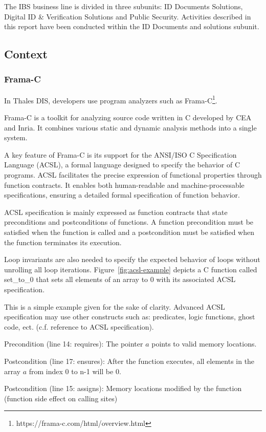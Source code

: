 \documentclass[10pt]{article}
\begin{document}
\begin{singlespace}
The IBS business line is divided in three subunits: ID Documents Solutions, Digital ID \& Verification Solutions and Public Security. Activities described in this report have been conducted within the ID Documents and solutions subunit.

\subsection{Context}
\subsubsection{Frama-C}
In Thales DIS, developers use program analyzers such as Frama-C\footnote{https://frama-c.com/html/overview.html}.

Frama-C is a toolkit for analyzing source code written in C developed by CEA and Inria. It combines various static and dynamic analysis methods into a single system.

A key feature of Frama-C is its support for the ANSI/ISO C Specification Language (ACSL), a formal language designed to specify the behavior of C programs. ACSL facilitates the precise expression of functional properties through function contracts. It enables both human-readable and machine-processable specifications, ensuring a detailed formal specification of function behavior.

ACSL specification is mainly expressed as function contracts that state preconditions and postconditions of functions. A function precondition must be satisfied when the function is called and a postcondition must be satisfied when the function terminates its execution.

Loop invariants are also needed to specify the expected behavior of loops without unrolling all loop iterations. Figure~\ref{fig:acsl-example} depicts a C function called set\_to\_0 that sets all elements of an array to 0 with its associated ACSL specification.

This is a simple example given for the sake of clarity. Advanced ACSL specification may use other constructs such as: predicates, logic functions, ghost code, ect. (c.f. reference to ACSL specification).

Precondition (line 14: requires): The pointer $a$ points to valid memory locations.

Postcondition (line 17: ensures): After the function executes, all elements in the array $a$ from index 0 to n-1 will be 0.

Postcondition (line 15: assigns): Memory locations modified by the function (function side effect on calling sites)


\end{singlespace}
\end{document}
